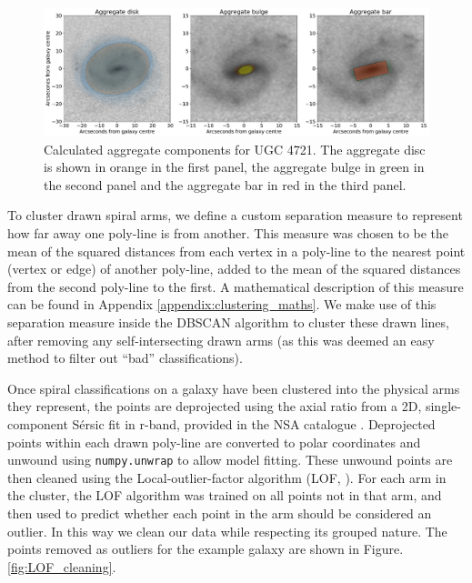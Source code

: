 \documentclass[../main.tex]{subfiles}
\begin{document}
\begin{figure}
  \includegraphics[width=17.3cm]{images__method/mean_shapes.pdf}
  \caption{Calculated aggregate components for UGC 4721. The aggregate disc is shown in orange in the first panel, the aggregate bulge in green in the second panel and the aggregate bar in red in the third panel.}
  \label{fig:mean_shapes}
\end{figure}

To cluster drawn spiral arms, we define a custom separation measure to represent how far away one poly-line is from another. This measure was chosen to be the mean of the squared distances from each vertex in a poly-line to the nearest point (vertex or edge) of another poly-line, added to the mean of the squared distances from the second poly-line to the first. A mathematical description of this measure can be found in Appendix \ref{appendix:clustering_maths}. We make use of this separation measure inside the DBSCAN algorithm to cluster these drawn lines, after removing any self-intersecting drawn arms (as this was deemed an easy method to filter out ``bad'' classifications).

Once spiral classifications on a galaxy have been clustered into the physical arms they represent, the points are deprojected using the axial ratio from a 2D, single-component S\'ersic fit in r-band, provided in the NSA catalogue \citep{2011AJ....142...31B}. Deprojected points within each drawn poly-line are converted to polar coordinates and unwound using \texttt{numpy.unwrap} to allow model fitting. These unwound points are then cleaned using the Local-outlier-factor algorithm (LOF, \citealt{local-outlier-factor}). For each arm in the cluster, the LOF algorithm was trained on all points not in that arm, and then used to predict whether each point in the arm should be considered an outlier. In this way we clean our data while respecting its grouped nature. The points removed as outliers for the example galaxy are shown in Figure. \ref{fig:LOF_cleaning}.
\end{document}
